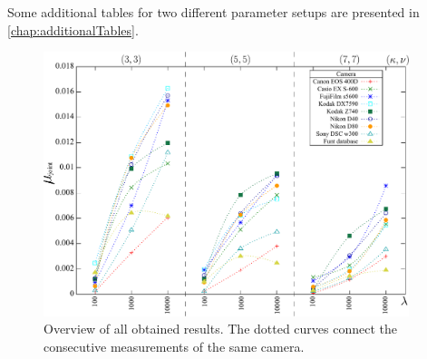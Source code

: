 Some additional tables for two different parameter setups are presented in \autoref{chap:additionalTables}.

\begin{figure}[bt]
	\centering
 	\includegraphics[width=0.95\textwidth]{stabilitytest/big_comparison.pdf}
	\caption[Overview of all obtained results]{Overview of all obtained results. The dotted curves connect the consecutive measurements of the same camera.}
\label{fig:bigcomparison}	
\end{figure}